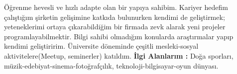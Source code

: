 \documentclass[paper=a4,fontsize=11pt]{temp} %
\begin{document}
\sepspace



Öğrenme hevesli ve hızlı adapte olan bir yapıya sahibim. Kariyer hedefim çalıştığım şirketin gelişimine katkıda bulunurken kendimi de geliştirmek; yeteneklerimi ortaya çıkarabildiğim bir firmada zevk alarak yeni projeler programlayabilmektir. Bilgi sahibi olmadığım konularda araştırmalar yapıp kendimi geliştiririm.
\sepspace
\newline
Üniversite döneminde çeşitli mesleki-sosyal aktivitelere(Meetup, seminerler) katıldım.
\sepspace
\newline
\textbf{İlgi Alanlarım : } Doğa sporları, müzik-edebiyat-sinema-fotoğrafçılık, teknoloji-bilgisayar-oyun dünyası.
\end{document}
